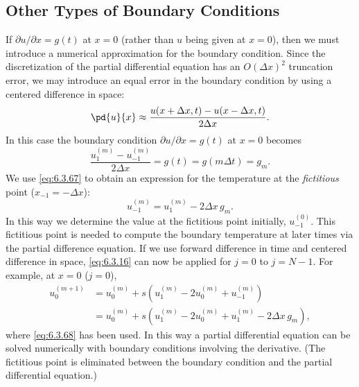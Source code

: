\subsection{Other Types of Boundary Conditions}
\label{sec:fd-heat-bc}

If $\partial u/\partial x = g(t)$ at $x = 0$ (rather than $u$ being given at $x = 0$), then we must introduce a numerical approximation for the boundary condition.  Since the discretization of the partial differential equation has an $O(\Delta x)^2$ truncation error, we may introduce an equal error in the boundary condition by using a centered difference in space:
\[
\pd{u}{x} \approx \frac{u(x + \Delta x, t) - u(x - \Delta x, t)}{2\Delta x}.
\]
In this case the boundary condition $\partial u/\partial x = g(t)$ at $x = 0$ becomes
\begin{equation}
\frac{u_1^{(m)} - u_{-1}^{(m)}}{2\Delta x} = g(t) = g(m\Delta t) = g_m.
\label{eq:6.3.67}
\end{equation}
We use \eqref{eq:6.3.67} to obtain an expression for the temperature at the \emph{fictitious} point ($x_{-1} = -\Delta x$):
\begin{equation}
u_{-1}^{(m)} = u_1^{(m)} - 2\Delta x\,g_m.
\label{eq:6.3.68}
\end{equation}
In this way we determine the value at the fictitious point initially, $u_{-1}^{(0)}$.  This fictitious point is needed to compute the boundary temperature at later times via the partial difference equation.  If we use forward difference in time and centered difference in space, \eqref{eq:6.3.16} can now be applied for $j = 0$ to $j = N-1$.  For example, at $x = 0$ ($j = 0$),
\begin{align*}
u_0^{(m+1)} &= u_0^{(m)} + s\left(u_1^{(m)} - 2u_0^{(m)} + u_{-1}^{(m)}\right) \\
&= u_0^{(m)} + s\left(u_1^{(m)} - 2u_0^{(m)} + u_1^{(m)} - 2\Delta x\,g_m\right),
\end{align*}
where \eqref{eq:6.3.68} has been used.  In this way a partial differential equation can be solved numerically with boundary conditions involving the derivative.  (The fictitious point is eliminated between the boundary condition and the partial differential equation.)

